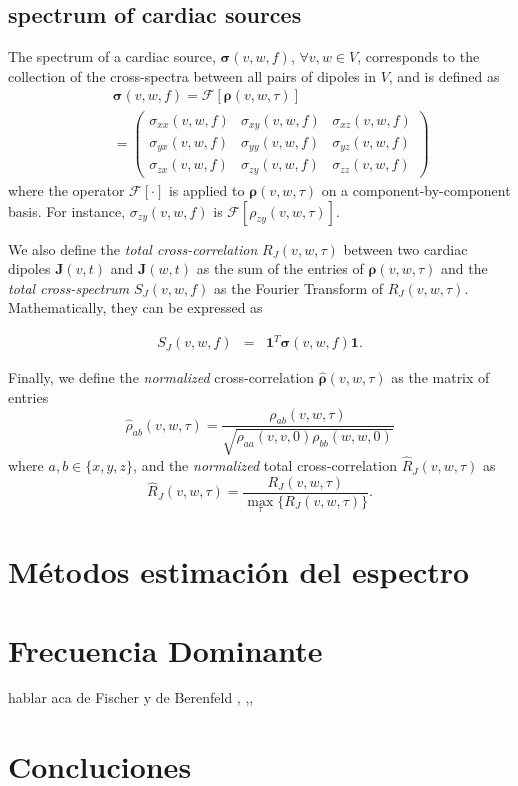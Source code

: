 \subsection{spectrum of cardiac sources}


 The spectrum of a cardiac source, $\boldsymbol{\sigma}(v,w,f)$, $\forall v,w\in
 V$, corresponds to the collection of the cross-spectra between all pairs of
 dipoles in $V$, and is defined as
 \begin{eqnarray}\label{eq:spectrum_source}
 &&\boldsymbol{\sigma}(v,w,f) =\mathcal{F}[\boldsymbol{\rho}(v,w,\tau)]
 \nonumber \\
 &&=\left( \begin{array}{ccc}
 {\sigma}_{xx}(v,w, f) & {\sigma}_{xy}(v,w, f) & {\sigma}_{xz}(v,w, f) \\
 {\sigma}_{yx}(v,w, f) & {\sigma}_{yy}(v,w, f) & {\sigma}_{yz}(v,w, f) \\
 {\sigma}_{zx}(v,w, f) & {\sigma}_{zy}(v,w, f) & {\sigma}_{zz}(v,w, f)
 \end{array} \right)
 \end{eqnarray}
 where the operator $\mathcal{F}[\cdot]$ is applied to
 $\boldsymbol{\rho}(v,w,\tau)$ on a component-by-component basis. For instance,
 ${\sigma}_{zy}(v,w, f)$ is $\mathcal{F}[{\rho}_{zy}(v,w,\tau)]$.

 We also define the \emph{total cross-correlation} $R_{J}(v,w,\tau)$ between two
 cardiac dipoles $\mathbf{J}(v,t)$ and $\mathbf{J}(w,t)$ as the sum of the
 entries of $\boldsymbol{\rho}(v,w,\tau)$ and the \emph{total cross-spectrum}
 $S_{J}(v,w,f)$ as the Fourier Transform of $R_{J}(v,w,\tau)$. Mathematically,
 they can be expressed as

 \begin{eqnarray}
 S_{J}(v,w,f)  &=&  \mathbf{1}^{T} \boldsymbol{\sigma}(v,w, f)  \mathbf{1}.
\label{total_spectrum}
\end{eqnarray}

 Finally, we define the \emph{normalized} cross-correlation
$\boldsymbol{\hat{\rho}}(v,w,\tau)$ as the matrix of entries
\begin{equation}\label{eq:normalized_autocorrelation_source}
\hat{\rho}_{ab}(v,w,\tau) = \frac{{\rho}_{ab}(v,w,\tau)}{\sqrt{{\rho}_{aa}(v,v,0){\rho}_{bb}(w,w,0)}}
\end{equation}
 where $a,b\in \{x,y,z\}$, and the \emph{normalized} total cross-correlation
$\hat{R}_{J}(v,w,\tau)$ as
\begin{equation}\label{normalized_total_corr}
\hat{R}_{J}(v,w,\tau)= \frac{R_{J}(v,w,\tau)}{{\underset{\tau}{\max}}\{R_{J}(v,w,\tau)\}}.
\end{equation}




\section{Métodos estimación del espectro}
\section{Frecuencia Dominante}

hablar aca de Fischer  \cite{Fischer07} y de Berenfeld \cite{Berenfeld10},
\cite{Berenfeld11} ,\cite{Berenfeld07}, \cite{Berenfeld10}

\section{Concluciones}
